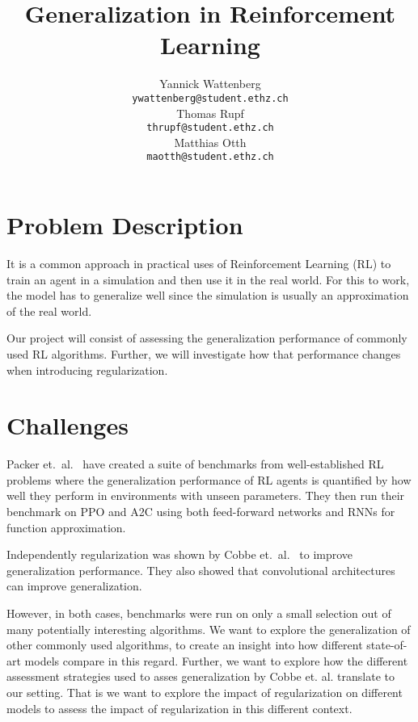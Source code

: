 \documentclass{article}
\title{Generalization in Reinforcement Learning}
\author{
    Yannick Wattenberg \\
    \texttt{ywattenberg@student.ethz.ch} \\
    \And
    Thomas Rupf \\
    \texttt{thrupf@student.ethz.ch} \\
    \AND
    Matthias Otth \\
    \texttt{maotth@student.ethz.ch} \\
}
\begin{document}
\maketitle

\section{Problem Description}
It is a common approach in practical uses of Reinforcement Learning (RL) to train an agent in a simulation and then use it in the real world. For this to work, the model has to generalize well since the simulation is usually an approximation of the real world.

Our project will consist of assessing the generalization performance of commonly used RL algorithms. Further, we will investigate how that performance changes when introducing regularization.

\section{Challenges}
Packer et.\ al.~\cite{packer2019assessing} have created a suite of benchmarks from well-established RL problems where the generalization performance of RL agents is quantified by how well they perform in environments with unseen parameters. They then run their benchmark on PPO and A2C using both feed-forward networks and RNNs for function approximation. 

Independently regularization was shown by Cobbe et.\ al.~\cite{cobbe2019quantifying} to improve generalization performance. They also showed that convolutional architectures can improve generalization. 

However, in both cases, benchmarks were run on only a small selection out of many potentially interesting algorithms. We want to explore the generalization of other commonly used algorithms, to create an insight into how different state-of-art models compare in this regard.
Further, we want to explore how the different assessment strategies used to asses generalization by Cobbe et. al. translate to our setting. 
That is we want to explore the impact of regularization on different models to assess the impact of regularization in this different context.

\end{document}
